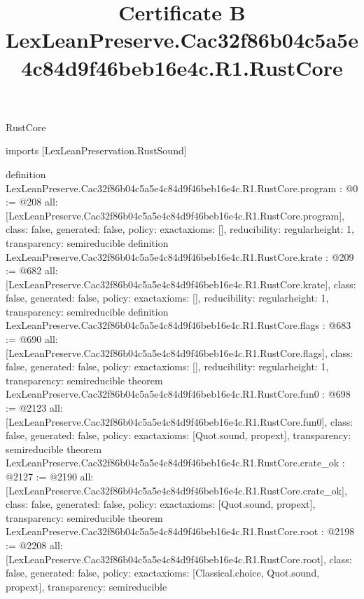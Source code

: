\begin{lexlean}{RustCore}
\title{Certificate B LexLeanPreserve.Cac32f86b04c5a5e4c84d9f46beb16e4c.R1.RustCore}
\begin{coremodule}
imports [LexLeanPreservation.RustSound]

definition LexLeanPreserve.Cac32f86b04c5a5e4c84d9f46beb16e4c.R1.RustCore.program : @0 := @208 {
  all: [LexLeanPreserve.Cac32f86b04c5a5e4c84d9f46beb16e4c.R1.RustCore.program],
  class: false,
  generated: false,
  policy: exact{axioms: []},
  reducibility: regular{height: 1},
  transparency: semireducible
}
definition LexLeanPreserve.Cac32f86b04c5a5e4c84d9f46beb16e4c.R1.RustCore.krate : @209 := @682 {
  all: [LexLeanPreserve.Cac32f86b04c5a5e4c84d9f46beb16e4c.R1.RustCore.krate],
  class: false,
  generated: false,
  policy: exact{axioms: []},
  reducibility: regular{height: 1},
  transparency: semireducible
}
definition LexLeanPreserve.Cac32f86b04c5a5e4c84d9f46beb16e4c.R1.RustCore.flags : @683 := @690 {
  all: [LexLeanPreserve.Cac32f86b04c5a5e4c84d9f46beb16e4c.R1.RustCore.flags],
  class: false,
  generated: false,
  policy: exact{axioms: []},
  reducibility: regular{height: 1},
  transparency: semireducible
}
theorem LexLeanPreserve.Cac32f86b04c5a5e4c84d9f46beb16e4c.R1.RustCore.fun0 : @698 := @2123 {
  all: [LexLeanPreserve.Cac32f86b04c5a5e4c84d9f46beb16e4c.R1.RustCore.fun0],
  class: false,
  generated: false,
  policy: exact{axioms: [Quot.sound, propext]},
  transparency: semireducible
}
theorem LexLeanPreserve.Cac32f86b04c5a5e4c84d9f46beb16e4c.R1.RustCore.crate_ok : @2127 := @2190 {
  all: [LexLeanPreserve.Cac32f86b04c5a5e4c84d9f46beb16e4c.R1.RustCore.crate_ok],
  class: false,
  generated: false,
  policy: exact{axioms: [Quot.sound, propext]},
  transparency: semireducible
}
theorem LexLeanPreserve.Cac32f86b04c5a5e4c84d9f46beb16e4c.R1.RustCore.root : @2198 := @2208 {
  all: [LexLeanPreserve.Cac32f86b04c5a5e4c84d9f46beb16e4c.R1.RustCore.root],
  class: false,
  generated: false,
  policy: exact{axioms: [Classical.choice, Quot.sound, propext]},
  transparency: semireducible
}


\end{coremodule}
\end{lexlean}
